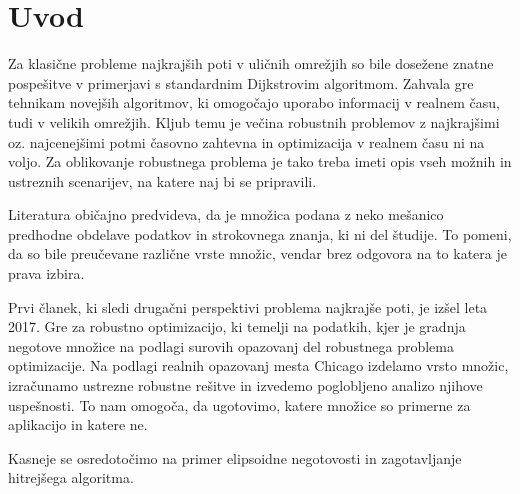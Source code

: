 \documentclass[a4paper, 12 pt]{article}
\theoremstyle{plain}
\theoremstyle{definition}
\theoremstyle{remark}
\begin{document}
\section{Uvod}
Za klasične probleme najkrajših poti v uličnih omrežjih so bile dosežene znatne pospešitve v primerjavi s standardnim Dijkstrovim algoritmom. Zahvala gre tehnikam novejših algoritmov, ki omogočajo uporabo informacij v realnem času, tudi v velikih omrežjih.
Kljub temu je večina robustnih problemov z najkrajšimi oz. najcenejšimi potmi časovno zahtevna in optimizacija v realnem času ni na voljo. Za oblikovanje robustnega problema je tako treba imeti opis vseh možnih in ustreznih scenarijev, na katere naj bi se pripravili.\newline

Literatura običajno predvideva, da je množica podana z neko mešanico predhodne obdelave podatkov in strokovnega znanja, ki ni del študije. To pomeni, da so bile preučevane različne vrste množic, vendar brez odgovora na to katera je prava izbira.\newline

Prvi članek, ki sledi drugačni perspektivi problema najkrajše poti, je izšel leta 2017. Gre za robustno optimizacijo, ki temelji na podatkih, kjer je gradnja negotove množice na podlagi surovih opazovanj del robustnega problema optimizacije. Na podlagi realnih opazovanj mesta Chicago izdelamo vrsto množic, izračunamo ustrezne robustne rešitve in izvedemo poglobljeno analizo njihove uspešnosti. To nam omogoča, da ugotovimo, katere množice so primerne za aplikacijo in katere ne.\newline

Kasneje se osredotočimo na primer elipsoidne negotovosti in zagotavljanje hitrejšega algoritma. 
\end{document}
